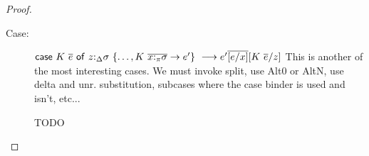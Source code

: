 \begin{proof}
\begin{description}
\item[Case:]
    $\mathsf{case}~K~\overline{e}~\mathsf{of}~z{:}_{\Delta}\sigma~\{\dots,K~\overline{x{:}_\pi\sigma}\to e'\}\ \longrightarrow e'\overline{[e/x]}[K~\overline{e}/z]$
This is another of the most interesting cases. We must invoke split, use Alt0
or AltN, use delta and unr. substitution, subcases where the case
binder is used and isn't, etc...
\begin{tabbing}
    TODO

\end{tabbing}
\end{description}
\end{proof}

